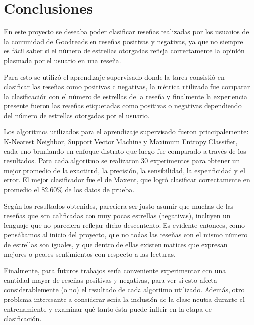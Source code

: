 \documentclass[hidelinks]{sig-alternate-05-2015}
\begin{document}
\section{Conclusiones}
En este proyecto se deseaba poder clasificar reseñas realizadas por los usuarios de la comunidad de Goodreads en reseñas positivas y negativas, ya que no siempre es fácil saber si el número de estrellas otorgadas refleja correctamente la opinión plasmada por el usuario en una reseña.

Para esto se utilizó el aprendizaje supervisado donde la tarea consistió en clasificar las reseñas como positivas o negativas, la métrica utilizada fue comparar la clasificación con el número de estrellas de la reseña y finalmente la experiencia presente fueron las reseñas etiquetadas como positivas o negativas dependiendo del número de estrellas otorgadas por el usuario. 

Los algoritmos utilizados para el aprendizaje supervisado fueron principalemente: K-Nearest Neighbor, Support Vector Machine y Maximum Entropy Classifier, cada uno brindando un enfoque distinto que luego fue comparado a través de los resultados. Para cada algoritmo se realizaron 30 experimentos para obtener un mejor promedio de la exactitud, la precisión, la sensibilidad, la especificidad y el error. El mejor clasificador fue el de Maxent, que logró clasificar correctamente en promedio el 82.60\% de los datos de prueba.

Según los resultados obtenidos, pareciera ser justo asumir que muchas de las reseñas que son calificadas con muy pocas estrellas (negativas), incluyen un lenguaje que no pareciera reflejar dicho descontento. Es evidente entonces, como pensábamos al inicio del proyecto, que no todas las reseñas con el mismo número de estrellas son iguales, y que dentro de ellas existen matices que expresan mejores o peores sentimientos con respecto a las lecturas.

Finalmente, para futuros trabajos sería conveniente experimentar con una cantidad mayor de reseñas positivas y negativas, para ver si esto afecta considerablemente (o no) el resultado de cada algoritmo utilizado. Además, otro problema interesante a considerar sería la inclusión de la clase neutra durante el entrenamiento y examinar qué tanto ésta puede influir en la etapa de clasificación.

\vspace*{1\baselineskip}
\end{document}
